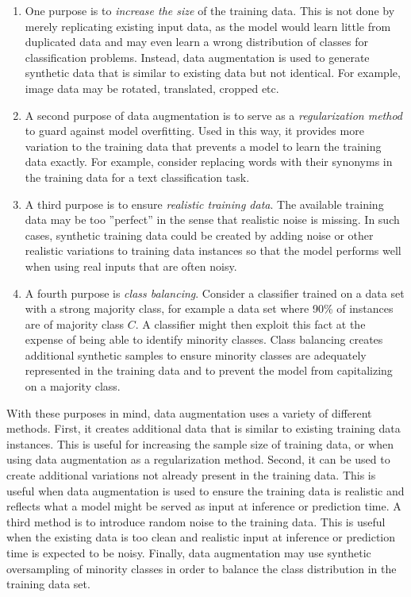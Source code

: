 \begin{enumerate}
\item One purpose is to \emph{increase the size} of the training data. This is not done by merely replicating existing input data, as the model would learn little from duplicated data and may even learn a wrong distribution of classes for classification problems. Instead, data augmentation is used to generate synthetic data that is similar to existing data but not identical. For example, image data may be rotated, translated, cropped etc. 

\item A second purpose of data augmentation is to serve as a \emph{regularization method} to guard against model overfitting. Used in this way, it provides more variation to the training data that prevents a model to learn the training data exactly. For example, consider replacing words with their synonyms in the training data for a text classification task. 

\item A third purpose is to ensure \emph{realistic training data}. The available training data may be too ''perfect'' in the sense that realistic noise is missing. In such cases, synthetic training data could be created by adding noise or other realistic variations to training data instances so that the model performs well when using real inputs that are often noisy.

\item A fourth purpose is  \emph{class balancing}. Consider a classifier trained on a data set with a strong majority class, for example a data set where 90\% of instances are of majority class $C$. A classifier might then exploit this fact at the expense of being able to identify minority classes. Class balancing creates additional synthetic samples to ensure minority classes are adequately represented in the training data and to prevent the model from capitalizing on a majority class.
\end{enumerate}

With these purposes in mind, data augmentation uses a variety of different methods. First, it creates additional data that is similar to existing training data instances. This is useful for increasing the sample size of training data, or when using data augmentation as a regularization method. Second, it can be used to create additional variations not already present in the training data. This is useful when data augmentation is used to ensure the training data is realistic and reflects what a model might be served as input at inference or prediction time. A third method is to introduce random noise to the training data. This is useful when the existing data is too clean and realistic input at inference or prediction time is expected to be noisy. Finally, data augmentation may use synthetic oversampling of minority classes in order to balance the class distribution in the training data set. 

